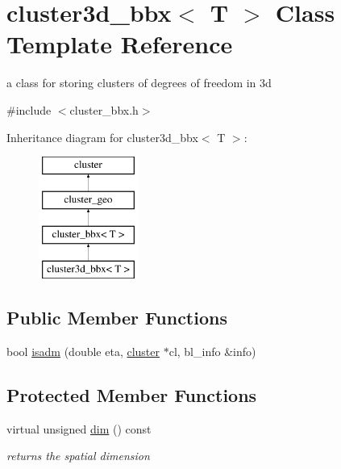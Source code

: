 \hypertarget{classcluster3d__bbx}{
\section{cluster3d\-\_\-bbx$<$ \-T $>$ \-Class \-Template \-Reference}
\label{classcluster3d__bbx}
}


a class for storing clusters of degrees of freedom in 3d  




{\ttfamily \#include $<$cluster\-\_\-bbx.\-h$>$}

\-Inheritance diagram for cluster3d\-\_\-bbx$<$ \-T $>$\-:\begin{figure}[H]
\begin{center}
\leavevmode
\includegraphics[height=4.000000cm]{classcluster3d__bbx}
\end{center}
\end{figure}
\subsection*{\-Public \-Member \-Functions}
\begin{DoxyCompactItemize}
\item 
bool \hyperlink{classcluster3d__bbx_a435d59e2b633d01a2748b7353168796e}{isadm} (double eta, \hyperlink{classcluster}{cluster} $\ast$cl, bl\-\_\-info \&info)
\end{DoxyCompactItemize}
\subsection*{\-Protected \-Member \-Functions}
\begin{DoxyCompactItemize}
\item 
\hypertarget{classcluster3d__bbx_a249df479ab36acd3151163eae90098dc}{
virtual unsigned \hyperlink{classcluster3d__bbx_a249df479ab36acd3151163eae90098dc}{dim} () const }
\label{classcluster3d__bbx_a249df479ab36acd3151163eae90098dc}

\begin{DoxyCompactList}\small\item\em returns the spatial dimension \end{DoxyCompactList}\end{DoxyCompactItemize}


